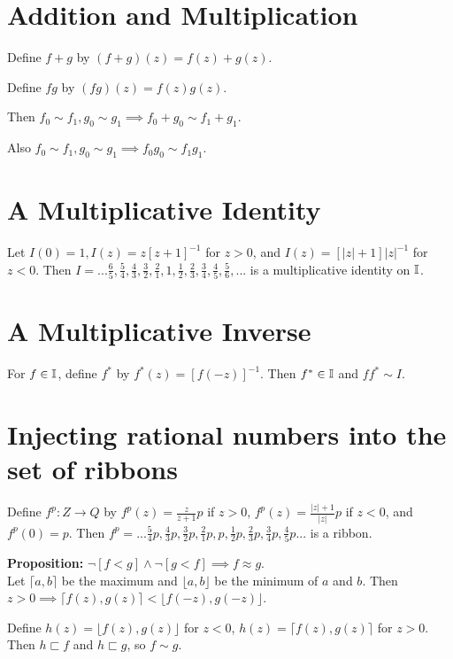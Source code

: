 \documentclass{article}
\newcommand{\ribbons}{\Bbb I}
\newcommand{\forks}{ \sqsubset}
\newcommand{\ident}{I}
\begin{document}
\begin{huge}
{{\section{Addition and Multiplication}

Define $f + g$ by $(f + g)(z) = f(z) + g(z)$.

Define $fg$ by $(fg)(z) = f(z)g(z)$. 

Then $f_0 \sim f_1, g_0 \sim g_1 \implies f_0 + g_0 \sim f_1 + g_1$.

Also $f_0 \sim f_1, g_0 \sim g_1 \implies f_0g_0 \sim f_1g_1$.\\

\section{A Multiplicative Identity}

Let $\ident(0) = 1, \ident(z) = z[z+1]^{-1}$ for $z > 0$, and $\ident(z) = [|z|+1]|z|^{-1}$ for $z < 0$. Then  $\ident = ...\frac{6}{5},\frac{5}{4},\frac{4}{3},\frac{3}{2},\frac{2}{1},1,\frac{1}{2},\frac{2}{3},\frac{3}{4},\frac{4}{5},\frac{5}{6},... $ is a multiplicative identity on $\ribbons$. 

\section{A Multiplicative Inverse}

For $f \in \ribbons$, define $f^*$ by $f^*(z) =  [ f(-z) ]^{-1} $. Then $f^* \in \ribbons$ and $ff^* \sim \ident$.

\section{Injecting rational numbers into the set of ribbons}

Define $f^p : Z \to Q$ by $f^p(z) = \frac{z}{z+1}p$ if $z > 0$, $f^p(z) = \frac{|z|+1}{|z|}p$ if $z < 0$, and $f^p(0) = p$. Then $f^p = ... \frac{5}{4}p,\frac{4}{3}p,\frac{3}{2}p,\frac{2}{1}p,p,\frac{1}{2}p,\frac{2}{3}p,\frac{3}{4}p,\frac{4}{5}p ...$ is a ribbon.

\textbf{Proposition:} $\neg [ f < g ] \wedge \neg [ g < f ]  \implies f \approx g$.\\ 


Let $\lceil{a,b}\rceil$ be the maximum and $\lfloor{a,b}\rfloor$ be the minimum of $a$ and $b$.  Then  $z > 0  \implies \lceil f(z),g(z) \rceil < \lfloor f(-z),g(-z) \rfloor$. 

Define $h(z) = \lfloor f(z),g(z) \rfloor$ for $z < 0$, $h(z) = \lceil f(z),g(z) \rceil$ for $ z > 0$. Then $h \forks f$ and $h \forks g$, so $f \sim g$.\\

}}
\end{huge}
\end{document}
